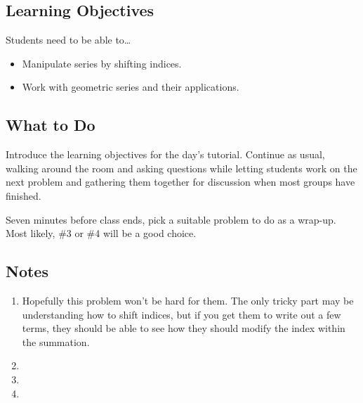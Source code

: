 \subsection*{Learning Objectives}
	Students need to be able to\ldots
	\begin{itemize}
		\item Manipulate series by shifting indices.
        \item Work with geometric series and their applications.
	\end{itemize}

\subsection*{What to Do}
	Introduce the learning objectives for the day's tutorial.
	Continue as usual, walking around the room and asking questions while letting students work on the next problem and gathering them together for discussion when most groups have finished.
    
    Seven minutes before class ends, pick a suitable problem to do as a wrap-up. Most likely, \#3 or \#4 will be a good choice.
	
\subsection*{Notes}
	\begin{enumerate}
		\item Hopefully this problem won't be hard for them. The only tricky part may be understanding how to shift indices, but if you get them to write out a few terms, they should be able to see how they should modify the index within the summation.

		\item 

		\item 

		\item 

	\end{enumerate}